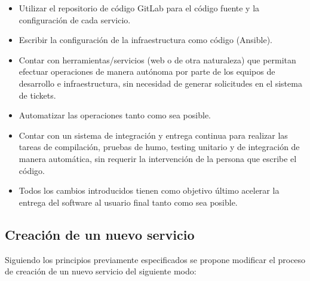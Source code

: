 \begin{itemize}
\item Utilizar el repositorio de código GitLab para el código fuente y
  la configuración de cada servicio.
\item Escribir la configuración de la infraestructura como código
  (Ansible).
\item Contar con herramientas/servicios (web o de otra naturaleza) que
  permitan efectuar operaciones de manera autónoma por parte de los
  equipos de desarrollo e infraestructura, sin necesidad de generar
  solicitudes en el sistema de tickets.
\item Automatizar las operaciones tanto como sea posible.
\item Contar con un sistema de integración y entrega continua para
  realizar las tareas de compilación, pruebas de humo, testing
  unitario y de integración de manera automática, sin requerir la
  intervención de la persona que escribe el código.
\item Todos los cambios introducidos tienen como objetivo último
  acelerar la entrega del software al usuario final tanto como sea
  posible.
\end{itemize}
\subsection{Creación de un nuevo servicio}

Siguiendo los principios previamente especificados se propone
modificar el proceso de creación de un nuevo servicio del siguiente
modo:


